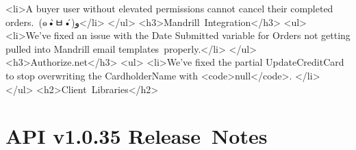 \documentclass{memoir}%
\begin{document}
<li>A buyer user without elevated permissions cannot cancel their completed orders.~(๑•̀ㅂ•́)و</li>\newline%
</ul>\newline%
<h3>Mandrill~Integration</h3>\newline%
<ul>\newline%
<li>We’ve fixed an issue with the Date Submitted variable for Orders not getting pulled into Mandrill email templates~properly.</li>\newline%
</ul>\newline%
<h3>Authorize.net</h3>\newline%
<ul>\newline%
<li>We’ve fixed the partial UpdateCreditCard to stop overwriting the CardholderName with <code>null</code>. </li>\newline%
</ul>\newline%
<h2>Client~Libraries</h2>

%
\section*{API v1.0.35 Release~Notes}%
\paragraph*{}%

%
\end{document}
